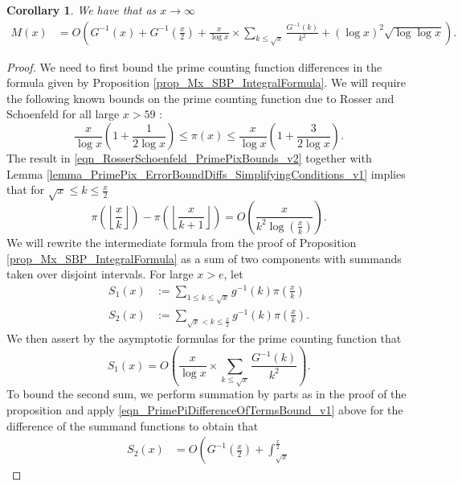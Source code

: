 \documentclass[11pt,reqno,a4letter]{article}
\numberwithin{figure}{section}
\numberwithin{table}{section}
\newcommand{\Floor}[2]{\ensuremath{\left\lfloor \frac{#1}{#2} \right\rfloor}}
\theoremstyle{plain}
\newtheorem{cor}[theorem]{Corollary}
\numberwithin{theorem}{section}
\theoremstyle{definition}
\begin{document}
\begin{cor} 
\label{cor_IntFormulaGInvx_for_Mx_v1} 
We have that as $x \rightarrow \infty$ 
\begin{align*}
     M(x) & = O\left(G^{-1}(x) + G^{-1}\left(\frac{x}{2}\right) + 
     \frac{x}{\log x} \times \sum_{k \leq \sqrt{x}} \frac{G^{-1}(k)}{k^2}
     + (\log x)^2 \sqrt{\log\log x}\right). 
\end{align*} 
\end{cor}
\begin{proof}
We need to first bound the prime counting function differences in the formula given by 
Proposition \ref{prop_Mx_SBP_IntegralFormula}. 
We will require the following known bounds on the prime counting 
function due to Rosser and Schoenfeld for all large $x > 59$ 
\cite[Thm.\ 1]{ROSSER-SCHOENFELD-1962}: 
\begin{equation} 
\label{eqn_RosserSchoenfeld_PrimePixBounds_v2} 
\frac{x}{\log x}\left(1 + \frac{1}{2\log x}\right) \leq \pi(x) \leq 
     \frac{x}{\log x}\left(1 + \frac{3}{2 \log x}\right). 
\end{equation} 
The result in \eqref{eqn_RosserSchoenfeld_PrimePixBounds_v2} together with 
Lemma \ref{lemma_PrimePix_ErrorBoundDiffs_SimplifyingConditions_v1} implies that 
for $\sqrt{x} \leq k \leq \frac{x}{2}$ 
\begin{equation}
\label{eqn_PrimePiDifferenceOfTermsBound_v1}
\pi\left(\Floor{x}{k}\right) - \pi\left(\Floor{x}{k+1}\right) = 
     O\left(\frac{x}{k^2 \log\left(\frac{x}{k}\right)}\right). 
\end{equation}
We will rewrite the intermediate formula from the proof of 
Proposition \ref{prop_Mx_SBP_IntegralFormula} 
as a sum of two components with summands taken over disjoint intervals. 
For large $x > e$, let 
\begin{align*}
S_1(x) & := \sum_{1 \leq k \leq \sqrt{x}} g^{-1}(k) \pi\left(\frac{x}{k}\right) \\ 
S_2(x) & := \sum_{\sqrt{x} < k \leq \frac{x}{2}} g^{-1}(k) \pi\left(\frac{x}{k}\right).
\end{align*}
We then assert by the asymptotic formulas for the 
prime counting function that 
\[
S_1(x) = O\left(\frac{x}{\log x} \times \sum_{k \leq \sqrt{x}} 
     \frac{G^{-1}(k)}{k^2}\right). 
\]
To bound the second sum, we perform summation by parts as in the proof of 
the proposition and apply \eqref{eqn_PrimePiDifferenceOfTermsBound_v1} above for the difference of the 
summand functions to obtain that 
\begin{align*} 
S_2(x) & = O\left(G^{-1}\left(\frac{x}{2}\right) + \int_{\sqrt{x}}^{\frac{x}{2}} 

\end{align*}
\end{proof}
\end{document}
